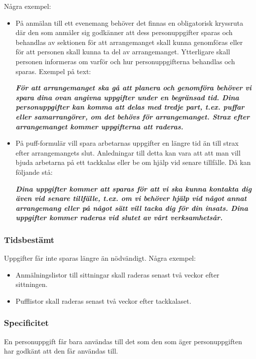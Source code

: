 \documentclass[a4paper]{dtek}
\begin{document}
Några exempel:
\begin{itemize}
    \item På anmälan till ett evenemang behöver det finnas en obligatorisk kryssruta där den
som anmäler sig godkänner att dess personuppgifter sparas och behandlas av sektionen för att arrangemanget skall kunna genomföras eller för att personen skall kunna
ta del av arrangemanget. Ytterligare skall personen informeras om varför och hur
personuppgifterna behandlas och sparas. Exempel på text:

\textit{\textbf{För att arrangemanget ska gå att planera och genomföra behöver vi spara dina ovan
angivna uppgifter under en begränsad tid. Dina personuppgifter kan komma att delas med
tredje part, t.ex. puffar eller samarrangörer, om det behövs för arrangemanget. Strax efter
arrangemanget kommer uppgifterna att raderas.
}}


    \item På puff-formulär vill spara arbetarnas uppgifter en längre tid än till strax efter arrangemangets slut. Anledningar till detta kan vara att att man vill bjuda arbetarna på ett tackkalas eller be om hjälp vid senare tillfälle. Då kan följande stå:
    
\textit{\textbf{Dina uppgifter kommer att sparas för att vi ska kunna kontakta dig även vid senare tillfälle, t.ex. om vi behöver hjälp vid något annat arrangemang eller på något sätt vill tacka dig för din insats. Dina uppgifter kommer raderas vid slutet av vårt verksamhetsår.}}
        
\end{itemize}

\subsubsection{Tidsbestämt}
Uppgifter får inte sparas längre än nödvändigt. Några exempel:
\begin{itemize}
    \item Anmälningslistor till sittningar skall raderas senast två veckor efter sittningen.
    \item Pufflistor skall raderas senast två veckor efter tackkalaset.
\end{itemize}

\subsubsection{Specificitet}
En personuppgift får bara användas till det som den som äger personuppgiften har godkänt
att den får användas till.
\end{document}
